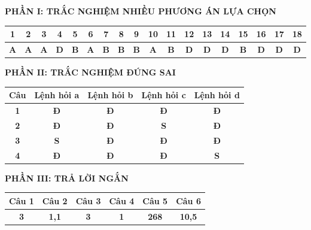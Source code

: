 \documentclass[11pt,a4paper]{article}
\begin{document}
\vspace{0.2cm}
\noindent\textbf{\color{mainGreen}PHẦN I: TRẮC NGHIỆM NHIỀU PHƯƠNG ÁN LỰA CHỌN}
\begin{center}
\renewcommand{\arraystretch}{1.2}
\begin{tabular}{|c|c|c|c|c|c|c|c|c|c|c|c|c|c|c|c|c|c|}
\hline
\textbf{1} & \textbf{2} & \textbf{3} & \textbf{4} & \textbf{5} & \textbf{6} & \textbf{7} & \textbf{8} & \textbf{9} & \textbf{10} & \textbf{11} & \textbf{12} & \textbf{13} & \textbf{14} & \textbf{15} & \textbf{16} & \textbf{17} & \textbf{18} \\ \hline
\textbf{\color{red}A} & \textbf{\color{red}A} & \textbf{\color{red}A} & \textbf{\color{red}D} & \textbf{\color{red}B} & \textbf{\color{red}A} & \textbf{\color{red}B} & \textbf{\color{red}B} & \textbf{\color{red}B} & \textbf{\color{red}A} & \textbf{\color{red}B} & \textbf{\color{red}D} & \textbf{\color{red}D} & \textbf{\color{red}D} & \textbf{\color{red}B} & \textbf{\color{red}D} & \textbf{\color{red}D} & \textbf{\color{red}D} \\ \hline
\end{tabular}
\end{center}

\vspace{0.3cm}
\noindent\textbf{\color{mainGreen}PHẦN II: TRẮC NGHIỆM ĐÚNG SAI}
\begin{center}
\renewcommand{\arraystretch}{1.2}
\begin{tabular}{|c|c|c|c|c|}
\hline
\textbf{Câu} & \textbf{Lệnh hỏi a} & \textbf{Lệnh hỏi b} & \textbf{Lệnh hỏi c} & \textbf{Lệnh hỏi d} \\ \hline
\textbf{1} & \textbf{\color{red}Đ} & \textbf{\color{red}Đ} & \textbf{\color{red}Đ} & \textbf{\color{red}Đ} \\ \hline
\textbf{2} & \textbf{\color{red}Đ} & \textbf{\color{red}Đ} & \textbf{S} & \textbf{\color{red}Đ} \\ \hline
\textbf{3} & \textbf{S} & \textbf{\color{red}Đ} & \textbf{\color{red}Đ} & \textbf{\color{red}Đ} \\ \hline
\textbf{4} & \textbf{\color{red}Đ} & \textbf{\color{red}Đ} & \textbf{\color{red}Đ} & \textbf{S} \\ \hline
\end{tabular}
\end{center}

\vspace{0.3cm}
\noindent\textbf{\color{mainGreen}PHẦN III: TRẢ LỜI NGẮN}
\begin{center}
\renewcommand{\arraystretch}{1.2}
\begin{tabular}{|c|c|c|c|c|c|}
\hline
\textbf{Câu 1} & \textbf{Câu 2} & \textbf{Câu 3} & \textbf{Câu 4} & \textbf{Câu 5} & \textbf{Câu 6} \\ \hline
\textbf{\color{red}3} & \textbf{\color{red}1,1} & \textbf{\color{red}3} & \textbf{\color{red}1} & \textbf{\color{red}268} & \textbf{\color{red}10,5} \\ \hline
\end{tabular}
\end{center}
\end{document}
